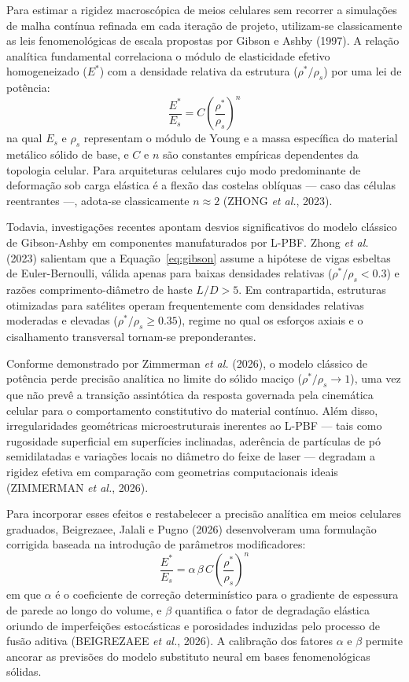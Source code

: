 Para estimar a rigidez macroscópica de meios celulares sem recorrer a simulações de malha contínua refinada em cada iteração de projeto, utilizam-se classicamente as leis fenomenológicas de escala propostas por Gibson e Ashby (1997). A relação analítica fundamental correlaciona o módulo de elasticidade efetivo homogeneizado ($E^{*}$) com a densidade relativa da estrutura ($\rho^{*}/\rho_s$) por uma lei de potência:
\begin{equation}
  \frac{E^{*}}{E_s} = C \left( \frac{\rho^{*}}{\rho_s} \right)^{n}
  \label{eq:gibson}
\end{equation}
na qual $E_s$ e $\rho_s$ representam o módulo de Young e a massa específica do material metálico sólido de base, e $C$ e $n$ são constantes empíricas dependentes da topologia celular. Para arquiteturas celulares cujo modo predominante de deformação sob carga elástica é a flexão das costelas oblíquas — caso das células reentrantes —, adota-se classicamente $n \approx 2$ (ZHONG \textit{et al.}, 2023).

Todavia, investigações recentes apontam desvios significativos do modelo clássico de Gibson-Ashby em componentes manufaturados por L-PBF. Zhong \textit{et al.} (2023) salientam que a Equação~\eqref{eq:gibson} assume a hipótese de vigas esbeltas de Euler-Bernoulli, válida apenas para baixas densidades relativas ($\rho^{*}/\rho_s < \num{0.3}$) e razões comprimento-diâmetro de haste $L/D > 5$. Em contrapartida, estruturas otimizadas para satélites operam frequentemente com densidades relativas moderadas e elevadas ($\rho^{*}/\rho_s \ge \num{0.35}$), regime no qual os esforços axiais e o cisalhamento transversal tornam-se preponderantes.

Conforme demonstrado por Zimmerman \textit{et al.} (2026), o modelo clássico de potência perde precisão analítica no limite do sólido maciço ($\rho^{*}/\rho_s \to 1$), uma vez que não prevê a transição assintótica da resposta governada pela cinemática celular para o comportamento constitutivo do material contínuo. Além disso, irregularidades geométricas microestruturais inerentes ao L-PBF — tais como rugosidade superficial em superfícies inclinadas, aderência de partículas de pó semidilatadas e variações locais no diâmetro do feixe de laser — degradam a rigidez efetiva em comparação com geometrias computacionais ideais (ZIMMERMAN \textit{et al.}, 2026).

Para incorporar esses efeitos e restabelecer a precisão analítica em meios celulares graduados, Beigrezaee, Jalali e Pugno (2026) desenvolveram uma formulação corrigida baseada na introdução de parâmetros modificadores:
\begin{equation}
  \frac{E^{*}}{E_s} = \alpha\,\beta\,C \left( \frac{\rho^{*}}{\rho_s} \right)^{n}
  \label{eq:refinado}
\end{equation}
em que $\alpha$ é o coeficiente de correção determinístico para o gradiente de espessura de parede ao longo do volume, e $\beta$ quantifica o fator de degradação elástica oriundo de imperfeições estocásticas e porosidades induzidas pelo processo de fusão aditiva (BEIGREZAEE \textit{et al.}, 2026). A calibração dos fatores $\alpha$ e $\beta$ permite ancorar as previsões do modelo substituto neural em bases fenomenológicas sólidas.

